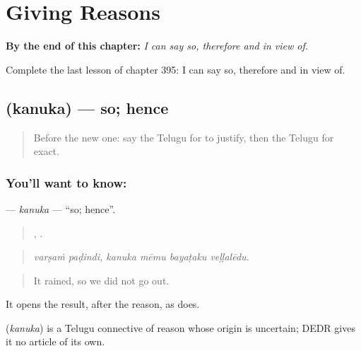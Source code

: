 
\chapter{Giving Reasons}
\label{ch:te-giving-reasons}

\begin{chapteropening}
\textbf{By the end of this chapter:} \emph{I can say so, therefore and in view of.}

Complete the last lesson of chapter 395: I can say so, therefore and in view of.
\end{chapteropening}

\section[\texorpdfstring{\te{కనుక} (kanuka)}{కనుక (kanuka)}]{ (kanuka) — so; hence}

\label{lesson:TE-C395-kanuka}



\begin{quote}
Before the new one: say the Telugu for to justify, then the Telugu for exact.
\end{quote}

\subsection*{You'll want to know: }
\textbf{} — \emph{kanuka} — \textquotedblleft{}so; hence\textquotedblright{}.

\begin{quote}
 ,    .
\end{quote}

\begin{quote}
\emph{varṣaṁ paḍindi, kanuka mēmu bayaṭaku veḷḷalēdu.}
\end{quote}

\begin{quote}
It rained, so we did not go out.
\end{quote}

It opens the result, after the reason, as  does.

\begin{cousinweb}
\textbf{} (\emph{kanuka}) is a Telugu connective of reason whose origin is uncertain; DEDR gives it no article of its own.
\end{cousinweb}

